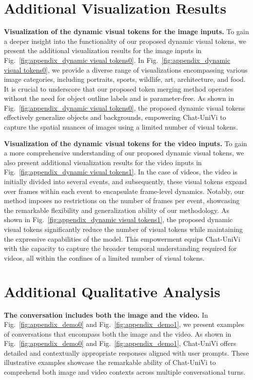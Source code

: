 \documentclass[10pt,twocolumn,letterpaper]{article}
\newcommand{\myparagraph}[1]{\textbf{#1}\hspace{1.8ex}}
\begin{document}
\section{Additional Visualization Results}\label{appendix:Additional Visualization Results}
\noindent \myparagraph{Visualization of the dynamic visual tokens for the image inputs.} 
To gain a deeper insight into the functionality of our proposed dynamic visual tokens, we present the additional visualization results for the image inputs in Fig.~\ref{fig:appendix_dynamic visual tokens0}. In Fig.~\ref{fig:appendix_dynamic visual tokens0}, we provide a diverse range of visualizations encompassing various image categories, including portraits, sports, wildlife, art, architecture, and food. It is crucial to underscore that our proposed token merging method operates without the need for object outline labels and is parameter-free. As shown in Fig.~\ref{fig:appendix_dynamic visual tokens0}, the proposed dynamic visual tokens effectively generalize objects and backgrounds, empowering Chat-UniVi to capture the spatial nuances of images using a limited number of visual tokens.

\noindent \myparagraph{Visualization of the dynamic visual tokens for the video inputs.} 
To gain a more comprehensive understanding of our proposed dynamic visual tokens, we also present additional visualization results for the video inputs in Fig.~\ref{fig:appendix_dynamic visual tokens1}. In the case of videos, the video is initially divided into several events, and subsequently, these visual tokens expand over frames within each event to encapsulate frame-level dynamics. Notably, our method imposes no restrictions on the number of frames per event, showcasing the remarkable flexibility and generalization ability of our methodology. As shown in Fig.~\ref{fig:appendix_dynamic visual tokens1}, the proposed dynamic visual tokens significantly reduce the number of visual tokens while maintaining the expressive capabilities of the model. This empowerment equips Chat-UniVi with the capacity to capture the broader temporal understanding required for videos, all within the confines of a limited number of visual tokens.

\section{Additional Qualitative Analysis}\label{appendix:Additional Qualitative Analysis}
\noindent \myparagraph{The conversation includes both the image and the video.} 
In Fig.~\ref{fig:appendix_demo0} and Fig.~\ref{fig:appendix_demo1}, we present examples of conversations that encompass both the image and the video. As shown in Fig.~\ref{fig:appendix_demo0} and Fig.~\ref{fig:appendix_demo1}, Chat-UniVi offers detailed and contextually appropriate responses aligned with user prompts. These illustrative examples showcase the remarkable ability of Chat-UniVi to comprehend both image and video contexts across multiple conversational turns.
\end{document}

